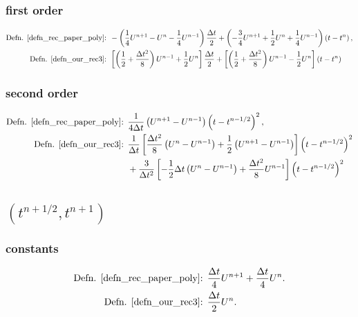 \documentclass[12pt,a4paper]{article}
\numberwithin{equation}{section}
\theoremstyle{definition}
\newcommand{\qp}[1]{\left(#1\right)}
\newcommand{\qb}[1]{\left[#1\right]}
\begin{document}
\subsubsection{first order}
\begin{equation*}
\begin{aligned}
\text{Defn. \ref{defn_rec_paper_poly}: }& -\qp{\frac{1}{4}U^{n+1}-U^n-\frac{1}{4}U^{n-1}} \frac{\Delta t}{2}+ 
 \qp{-\frac{3}{4}U^{n+1}+\frac{1}{2}U^n+\frac{1}{4}U^{n-1}}\qp{t-t^n},\\
 \text{Defn. \ref{defn_our_rec3}: }&  \qb{\qp{\frac{1}{2}+\frac{\Delta t^2}{8}}U^{n-1}+\frac{1}{2}U^n}\frac{\Delta t}{2}+
 \qb{\qp{\frac{1}{2}+\frac{\Delta t^2}{8}}U^{n-1}-\frac{1}{2}U^n}\qp{t-t^n}
\end{aligned}
\end{equation*}

\subsubsection{second order}
\begin{equation*}
\begin{aligned}
\text{Defn. \ref{defn_rec_paper_poly}: }& \frac{1}{4\Delta t}\qp{U^{n+1}-U^{n-1}}\qp{t-t^{n-1/2}}^2,\\
\text{Defn. \ref{defn_our_rec3}: }&  \frac{1}{\Delta t}\qb{\frac{\Delta t^2}{8}\qp{U^{n}-U^{n-1}}+\frac{1}{2}\qp{U^{n+1}-U^{n-1}}}\qp{t-t^{n-1/2}}^2\\
&+\frac{3}{\Delta t^2}\qb{-\frac{1}{2}\Delta t\qp{U^n-U^{n-1}}+\frac{\Delta t^2}{8}U^{n-1}}\qp{t-t^{n-1/2}}^2
\end{aligned}
\end{equation*}

\subsection{$\qp{t^{n+1/2},t^{n+1}}$}
\subsubsection{constants}
\begin{equation*}
\begin{aligned}
\text{Defn. \ref{defn_rec_paper_poly}: }&\frac{\Delta t}{4}U^{n+1}+\frac{\Delta t}{4}U^n. \\
\text{Defn. \ref{defn_our_rec3}: }&\frac{\Delta t}{2}U^{n}.
\end{aligned}
\end{equation*}
\end{document}
